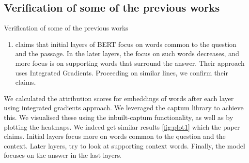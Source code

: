 \documentclass[10pt]{beamer}
\begin{document}
\subsection{Verification of some of the previous works} \label{section2.1}
\begin{frame}{Verification of some of the previous works}
\begin{enumerate}
    \item \cite{bert_for_qa} claims that initial layers of BERT focus on words common to the question and the passage. In the later layers, the focus on such words decreases, and more focus is on supporting words that surround the answer. Their approach uses Integrated Gradients. Proceeding on similar lines, we confirm their claims.
\end{enumerate}

We calculated the attribution scores for embeddings of words after each layer using integrated gradients approach. We leveraged the captum library to achieve this. We visualised these using the inbuilt-captum functionality, as well as by plotting the heatmaps. We indeed get similar results \ref{fig:plot1} which the paper claims. Initial layers focus more on words common to the question and the context. Later layers, try to look at supporting context words. Finally, the model focuses on the answer in the last layers.
\end{frame}
\end{document}
